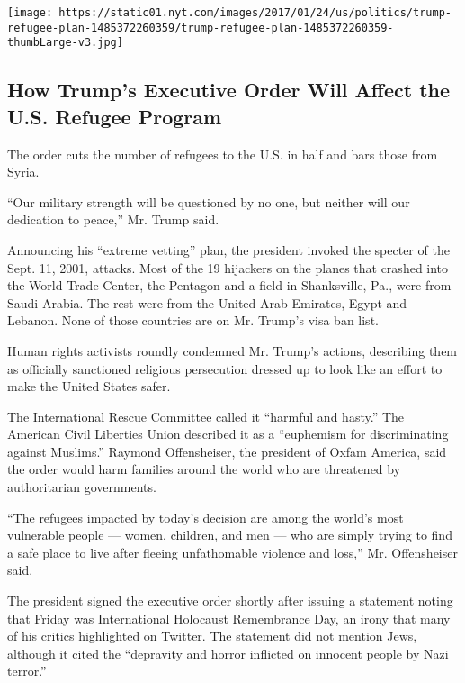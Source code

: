 \href{https://www.nytimes.com/interactive/2017/01/25/us/politics/trump-refugee-plan.html}{}

\texttt{[image: https://static01.nyt.com/images/2017/01/24/us/politics/trump-refugee-plan-1485372260359/trump-refugee-plan-1485372260359-thumbLarge-v3.jpg]}

\hypertarget{how-trumps-executive-order-will-affect-the-us-refugee-program}{%
\subsection{How Trump's Executive Order Will Affect the U.S. Refugee
Program}\label{how-trumps-executive-order-will-affect-the-us-refugee-program}}

The order cuts the number of refugees to the U.S. in half and bars those
from Syria.

``Our military strength will be questioned by no one, but neither will
our dedication to peace,'' Mr. Trump said.

Announcing his ``extreme vetting'' plan, the president invoked the
specter of the Sept. 11, 2001, attacks. Most of the 19 hijackers on the
planes that crashed into the World Trade Center, the Pentagon and a
field in Shanksville, Pa., were from Saudi Arabia. The rest were from
the United Arab Emirates, Egypt and Lebanon. None of those countries are
on Mr. Trump's visa ban list.

Human rights activists roundly condemned Mr. Trump's actions, describing
them as officially sanctioned religious persecution dressed up to look
like an effort to make the United States safer.

The International Rescue Committee called it ``harmful and hasty.'' The
American Civil Liberties Union described it as a ``euphemism for
discriminating against Muslims.'' Raymond Offensheiser, the president of
Oxfam America, said the order would harm families around the world who
are threatened by authoritarian governments.

``The refugees impacted by today's decision are among the world's most
vulnerable people --- women, children, and men --- who are simply trying
to find a safe place to live after fleeing unfathomable violence and
loss,'' Mr. Offensheiser said.

The president signed the executive order shortly after issuing a
statement noting that Friday was International Holocaust Remembrance
Day, an irony that many of his critics highlighted on Twitter. The
statement did not mention Jews, although it
\href{https://www.whitehouse.gov/the-press-office/2017/01/27/statement-president-international-holocaust-remembrance-day}{cited}
the ``depravity and horror inflicted on innocent people by Nazi
terror.''

